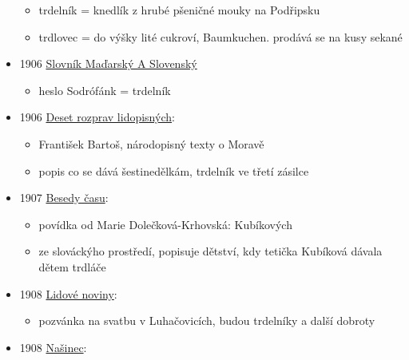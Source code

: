 \begin{itemize}
  \begin{itemize}
  \tightlist
  \item
    trdelník = knedlík z hrubé pšeničné mouky na Podřipsku
  \item
    trdlovec = do výšky lité cukroví, Baumkuchen. prodává se na kusy
    sekané
  \end{itemize}
\item
  1906
  \href{https://dikda.snk.sk/uuid/uuid:a5d481cd-45e0-4830-8eb3-f6a70599c799}{Slovník
  Maďarský A Slovenský}

  \begin{itemize}
  \tightlist
  \item
    heslo Sodrófánk = trdelník
  \end{itemize}
\item
  1906
  \href{https://ceskadigitalniknihovna.cz/view/uuid:50b3ac32-1b3f-4639-9f61-c01f3883690d?page=uuid:ad4dfae7-7a29-11ed-b508-001b63bd97ba&fulltext=trdeln\%C3\%ADky&source=kfbz}{Deset
  rozprav lidopisných}:

  \begin{itemize}
  \tightlist
  \item
    František Bartoš, národopisný texty o Moravě
  \item
    popis co se dává šestinedělkám, trdelník ve třetí zásilce
  \end{itemize}
\item
  1907
  \href{https://ceskadigitalniknihovna.cz/uuid/uuid:9a11a910-6d75-11e8-be68-5ef3fc9bb22f}{Besedy
  času}:

  \begin{itemize}
  \tightlist
  \item
    povídka od Marie Dolečková-Krhovská: Kubíkových
  \item
    ze slováckýho prostředí, popisuje dětství, kdy tetička Kubíková
    dávala dětem trdláče
  \end{itemize}
\item
  1908
  \href{https://www.digitalniknihovna.cz/vkol/uuid/uuid:c11919dc-435d-11dd-b505-00145e5790ea}{Lidové
  noviny}:

  \begin{itemize}
  \tightlist
  \item
    pozvánka na svatbu v Luhačovicích, budou trdelníky a další dobroty
  \end{itemize}
\item
  1908
  \href{https://ceskadigitalniknihovna.cz/uuid/uuid:d373d613-8285-11e0-b92b-0050569d679d}{Našinec}:


\end{itemize}
